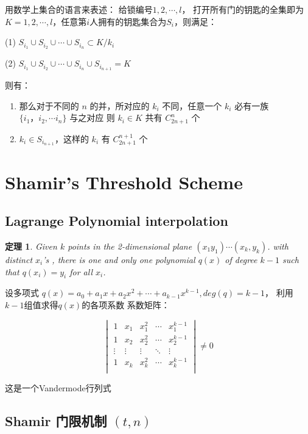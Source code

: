 \documentclass[10t, a4paper, oneside]{ctexbook}
\newtheorem{theorem}{定理}[section]
\begin{document}
用数学上集合的语言来表述： 给锁编号$1,2,\cdots,l$， 打开所有门的钥匙的全集即为 $K = {1,2,\cdots,l}$，任意第$i$人拥有的钥匙集合为$S_i$，则满足：

(1) $S_{i_1} \cup S_{i_2}\cup \cdots\cup S_{i_n} \subset K/k_i$\par
(2) $S_{i_1} \cup S_{i_2}\cup \cdots \cup S_{i_n}\cup S_{i_{n+1}} = K$
 
则有：
\begin{enumerate}
    \item 那么对于不同的 $n$ 的并，所对应的 $k_i$ 不同，任意一个 $k_i$ 必有一族 $\{i_1，i_2,\cdots i_n\}$ 与之对应 则 $k_i\in K$ 共有 $C_{2n+1}^n$ 个
    \item $k_i \in S_{i_{n+1}}$，这样的 $k_i$ 有 $C_{2n+1}^{n+1}$ 个
\end{enumerate} 



\section{Shamir's Threshold Scheme}

\subsection{Lagrange Polynomial interpolation} 

\begin{theorem}
Given $k$ points in the 2-dimensional plane $(x_1 y_1) \cdots (x_k, y_k)$. 
with distinct $x_i$'s , there is one and only one polynomial $q(x)$ of degree $k - 1$ such that $q(x_i) =y_i$ for all $x_i$.        
\end{theorem}

设多项式 $q(x) = a_0 + a_1 x + a_2 x^2 + \cdots+ a_{k-1} x^{k-1}, deg(q) = k-1$，  利用$k-1$组值求得$q(x)$的各项系数  
系数矩阵：

$$\begin{vmatrix}
1 & x_1 & x_1^2 & \cdots & x_1^{k-1} \\
1 & x_2 & x_2^2 & \cdots & x_2^{k-1} \\
\vdots & \vdots & \vdots & \ddots & \vdots \\
1 & x_k & x_k^2 & \cdots & x_k^{k-1} \\
\end{vmatrix} \neq 0$$

这是一个Vandermode行列式 

\subsection{Shamir 门限机制 $(t,n)$}
\end{document}
